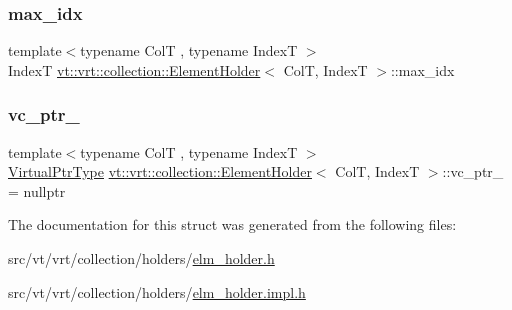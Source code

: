 \subsubsection{\texorpdfstring{max\+\_\+idx}{max\_idx}}
{\footnotesize\ttfamily template$<$typename ColT , typename IndexT $>$ \\
IndexT \hyperlink{structvt_1_1vrt_1_1collection_1_1_element_holder}{vt\+::vrt\+::collection\+::\+Element\+Holder}$<$ ColT, IndexT $>$\+::max\+\_\+idx}

\mbox{\label{structvt_1_1vrt_1_1collection_1_1_element_holder_a2112b3755d594225583fb89ab3185bd2}} 
\subsubsection{\texorpdfstring{vc\+\_\+ptr\+\_\+}{vc\_ptr\_}}
{\footnotesize\ttfamily template$<$typename ColT , typename IndexT $>$ \\
\hyperlink{structvt_1_1vrt_1_1collection_1_1_element_holder_afc12d1a71ec8f735f1b7fe12a067c8a6}{Virtual\+Ptr\+Type} \hyperlink{structvt_1_1vrt_1_1collection_1_1_element_holder}{vt\+::vrt\+::collection\+::\+Element\+Holder}$<$ ColT, IndexT $>$\+::vc\+\_\+ptr\+\_\+ = nullptr}



The documentation for this struct was generated from the following files\+:\begin{DoxyCompactItemize}
\item 
src/vt/vrt/collection/holders/\hyperlink{elm__holder_8h}{elm\+\_\+holder.\+h}\item 
src/vt/vrt/collection/holders/\hyperlink{elm__holder_8impl_8h}{elm\+\_\+holder.\+impl.\+h}\end{DoxyCompactItemize}
